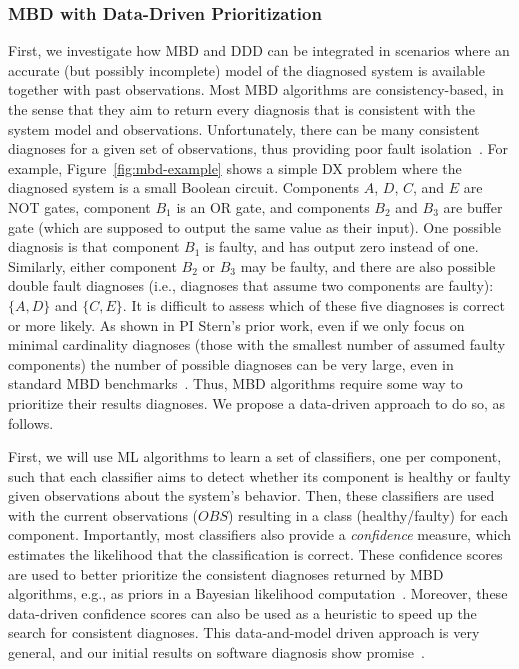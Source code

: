 \documentclass[12pt]{article}
\begin{document}
\subsubsection{MBD with Data-Driven Prioritization} 
First, we investigate how MBD and DDD can be integrated in scenarios where an accurate (but possibly incomplete) model of the diagnosed system is available together with past observations. 
Most MBD algorithms are consistency-based, in the sense that they aim to return every diagnosis  that is consistent with the system model and observations. 
Unfortunately, there can be many consistent diagnoses for a given set of observations, thus providing poor fault isolation~\cite{stern2015many}. 
For example, Figure~\ref{fig:mbd-example} shows a simple DX problem where the diagnosed system is a small Boolean circuit. Components $A$, $D$, $C$, and $E$ are NOT gates, component $B_1$ is an OR gate, and components $B_2$ and $B_3$ are buffer gate (which are supposed to output the same value as their input). One possible diagnosis is that component $B_1$ is faulty, and has output zero instead of one. Similarly, either component $B_2$ or $B_3$ may be faulty, 
and there are also possible double fault diagnoses (i.e., diagnoses that assume two components are faulty): $\{ A,D \}$ and $\{C,E\}$. It is difficult to assess which of these five diagnoses is correct or more likely. 
As shown in PI Stern's prior work, even if we only focus on minimal cardinality diagnoses (those with the smallest number of assumed faulty components) the number of possible diagnoses can be very large, even in standard MBD benchmarks~\cite{stern2015many}. Thus, MBD algorithms require some way to prioritize their results diagnoses. We propose a data-driven approach to do so, as follows. 


First, we will use ML algorithms to learn a set of classifiers, one per component, such that each classifier aims to detect whether its component is healthy or faulty given observations about the system's behavior. 
Then, these classifiers are used with the current observations ($OBS$) resulting in a class (healthy/faulty) for each component. Importantly, most classifiers also provide a {\em confidence} measure, which estimates the likelihood that the classification is correct. These confidence scores are used 
to better prioritize the consistent diagnoses returned by MBD algorithms, e.g., as priors in a Bayesian likelihood computation~\cite{abreu2009new}. Moreover, these data-driven confidence scores can also be used as a heuristic to speed up the search for consistent diagnoses. This data-and-model driven approach is very general, and our initial results on software  diagnosis show promise~\cite{elmishali2016dataAugmented}. 
\end{document}
